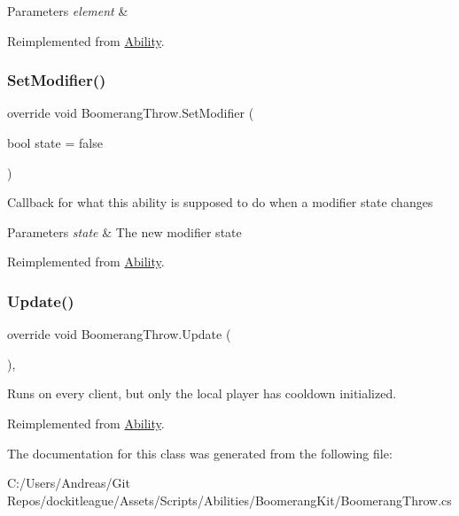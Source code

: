 \begin{DoxyParams}{Parameters}
{\em element} & \\
\hline
\end{DoxyParams}


Reimplemented from \hyperlink{class_ability_ad01c565b443fdca24556f1d7c054da3f}{Ability}.

\hypertarget{class_boomerang_throw_abd3070a4e57ae10d7578d6de618b5c2e}{}\label{class_boomerang_throw_abd3070a4e57ae10d7578d6de618b5c2e} 
\subsubsection{\texorpdfstring{Set\+Modifier()}{SetModifier()}}
{\footnotesize\ttfamily override void Boomerang\+Throw.\+Set\+Modifier (\begin{DoxyParamCaption}\item[{bool}]{state = {\ttfamily false} }\end{DoxyParamCaption})\hspace{0.3cm}{\ttfamily [virtual]}}



Callback for what this ability is supposed to do when a modifier state changes 


\begin{DoxyParams}{Parameters}
{\em state} & The new modifier state\\
\hline
\end{DoxyParams}


Reimplemented from \hyperlink{class_ability_a18f5361c45dc334b541892880382c098}{Ability}.

\hypertarget{class_boomerang_throw_a2388db1d5710a58189134f8359da2bc1}{}\label{class_boomerang_throw_a2388db1d5710a58189134f8359da2bc1} 
\subsubsection{\texorpdfstring{Update()}{Update()}}
{\footnotesize\ttfamily override void Boomerang\+Throw.\+Update (\begin{DoxyParamCaption}{ }\end{DoxyParamCaption})\hspace{0.3cm}{\ttfamily [protected]}, {\ttfamily [virtual]}}



Runs on every client, but only the local player has cooldown initialized. 



Reimplemented from \hyperlink{class_ability_a88d799f38be464be5f0a9a315efb2d0b}{Ability}.



The documentation for this class was generated from the following file\+:\begin{DoxyCompactItemize}
\item 
C\+:/\+Users/\+Andreas/\+Git Repos/dockitleague/\+Assets/\+Scripts/\+Abilities/\+Boomerang\+Kit/Boomerang\+Throw.\+cs\end{DoxyCompactItemize}
